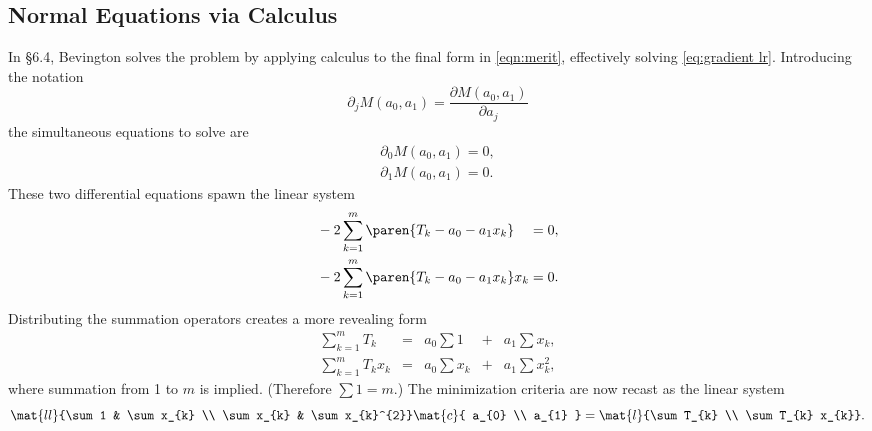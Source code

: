 \subsection{\label{sec:normal I}Normal Equations via Calculus}  %
In \S 6.4, Bevington solves the problem by applying calculus to the final form in \eqref{eqn:merit}, effectively solving \eqref{eq:gradient lr}. Introducing the notation
  \begin{equation*}   %
       \partial_{j} M (a_{0}, a_{1}) = \frac{\partial M(a_{0}, a_{1})}{\partial a_{j}}
  \end{equation*}
the simultaneous equations to solve are
  \begin{equation}   %
    \begin{split}
       \partial_{0} M (a_{0}, a_{1}) = 0 , \\
       \partial_{1} M (a_{0}, a_{1}) = 0 .
    \label{eq:bev pde}
    \end{split}
  \end{equation}
These two differential equations spawn the linear system
\begin{equation}
  \begin{split}
    &-2 \sum_{k=1}^{m} \paren{T_{k} - a_{0} - a_{1}x_{k}} \phantom{x_{k}} = 0, \\
    &-2 \sum_{k=1}^{m} \paren{T_{k} - a_{0} - a_{1}x_{k}} x_{k}  = 0.
  \end{split}
  \label{eq:calculus normal}
\end{equation}
Distributing the summation operators creates a more revealing form  \\[-5pt]
  \begin{equation*}   %
  \begin{array}{lclclcl}
    \sum\limits_{k=1}^{m} T_{k}       & = & a_{0} \sum 1     & + & a_{1} \sum x_{k}, \\
    \sum\limits_{k=1}^{m} T_{k} x_{k} & = & a_{0} \sum x_{k} & + & a_{1} \sum x_{k}^{2}, 
  \end{array}
  \end{equation*}
where summation from 1 to $m$ is implied. (Therefore $\sum 1 = m$.) The minimization criteria are
now recast as the linear system
  \begin{equation}   %
      \mat{ll}{\sum 1 & \sum x_{k} \\ \sum x_{k} & \sum x_{k}^{2}}
      \mat{c}{ a_{0} \\ a_{1} } = 
      \mat{l}{\sum T_{k} \\ \sum T_{k} x_{k}}.
    \label{eq:modal matrix eq}
  \end{equation}

